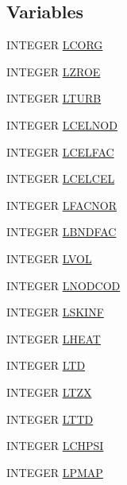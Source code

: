 \subsection*{Variables}
\begin{DoxyCompactItemize}
\item 
I\-N\-T\-E\-G\-E\-R \hyperlink{nloc_8com_a0af2a3cec2780018a2c188475b263b7b}{L\-C\-O\-R\-G}
\item 
I\-N\-T\-E\-G\-E\-R \hyperlink{nloc_8com_a53773d20e98c4b230f3051dff12f02d1}{L\-Z\-R\-O\-E}
\item 
I\-N\-T\-E\-G\-E\-R \hyperlink{nloc_8com_ac0bae9360ed1ee49132a1100fd133e47}{L\-T\-U\-R\-B}
\item 
I\-N\-T\-E\-G\-E\-R \hyperlink{nloc_8com_acb705f72dc7fda4b4587e054e5be18cb}{L\-C\-E\-L\-N\-O\-D}
\item 
I\-N\-T\-E\-G\-E\-R \hyperlink{nloc_8com_a2bcb7bc1e5f56d5c6f4214e11c6a2d6d}{L\-C\-E\-L\-F\-A\-C}
\item 
I\-N\-T\-E\-G\-E\-R \hyperlink{nloc_8com_ae39c32ca2db16a8fca699e2af80435aa}{L\-C\-E\-L\-C\-E\-L}
\item 
I\-N\-T\-E\-G\-E\-R \hyperlink{nloc_8com_a9168556bdefddc5bf02b5c8b8bd27e24}{L\-F\-A\-C\-N\-O\-R}
\item 
I\-N\-T\-E\-G\-E\-R \hyperlink{nloc_8com_a42041e6989af6cbb2608df9c0d079dea}{L\-B\-N\-D\-F\-A\-C}
\item 
I\-N\-T\-E\-G\-E\-R \hyperlink{nloc_8com_acd5ab1d9bb544d5a4a6a2176d6a4a462}{L\-V\-O\-L}
\item 
I\-N\-T\-E\-G\-E\-R \hyperlink{nloc_8com_ac60737f8a2639aca5962c9f2be2afe13}{L\-N\-O\-D\-C\-O\-D}
\item 
I\-N\-T\-E\-G\-E\-R \hyperlink{nloc_8com_ad5faaed758e745105721a25f6ff65e36}{L\-S\-K\-I\-N\-F}
\item 
I\-N\-T\-E\-G\-E\-R \hyperlink{nloc_8com_a4a8137a1f2298c7fcb61b4f41bb3f2c9}{L\-H\-E\-A\-T}
\item 
I\-N\-T\-E\-G\-E\-R \hyperlink{nloc_8com_a0b1f5dbbdc62804ec5dc66af1e132a37}{L\-T\-D}
\item 
I\-N\-T\-E\-G\-E\-R \hyperlink{nloc_8com_a537c58a1ee889969543d80d603f7a358}{L\-T\-Z\-X}
\item 
I\-N\-T\-E\-G\-E\-R \hyperlink{nloc_8com_a0d4fc998108c0f869ce087a3b54bdca6}{L\-T\-T\-D}
\item 
I\-N\-T\-E\-G\-E\-R \hyperlink{nloc_8com_a8764a03c9a3d37242bf263951a9b72fe}{L\-C\-H\-P\-S\-I}
\item 
I\-N\-T\-E\-G\-E\-R \hyperlink{nloc_8com_aad3707d655f61ee00f44d0ffafa8ad6a}{L\-P\-M\-A\-P}

\end{DoxyCompactItemize}

